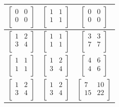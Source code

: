 \documentclass[a4paper,14pt]{report}
\begin{document}
\begin{table}[h]
\begin{tabular}{|c | c | c |}
		$\begin{bmatrix}
		0 & 0 \\
		0 & 0 \\
		\end{bmatrix}$ &
		$\begin{bmatrix}
		1 & 1 \\
		1 & 1 \\
		\end{bmatrix}$ &
		$\begin{bmatrix}
		0 & 0 \\
		0 & 0 \\
		\end{bmatrix}$ \\
		\hline

		$\begin{bmatrix}
		1 & 2 \\
		3 & 4 \\
		\end{bmatrix}$ &
		$\begin{bmatrix}
		1 & 1 \\
		1 & 1 \\
		\end{bmatrix}$ &
		$\begin{bmatrix}
		3 & 3 \\
		7 & 7 \\
		\end{bmatrix}$ \\
		\hline

		$\begin{bmatrix}
		1 & 1 \\
		1 & 1 \\
		\end{bmatrix}$ &
		$\begin{bmatrix}
		1 & 2 \\
		3 & 4 \\
		\end{bmatrix}$ &
		$\begin{bmatrix}
		4 & 6 \\
		4 & 6 \\
		\end{bmatrix}$ \\
		\hline

		$\begin{bmatrix}
		1 & 2 \\
		3 & 4 \\
		\end{bmatrix}$ &
		$\begin{bmatrix}
		1 & 2 \\
		3 & 4 \\
		\end{bmatrix}$ &
		$\begin{bmatrix}
		7 & 10 \\
		15 & 22 \\
		\end{bmatrix}$ \\
		\hline


\end{tabular}
\end{table}
\end{document}

